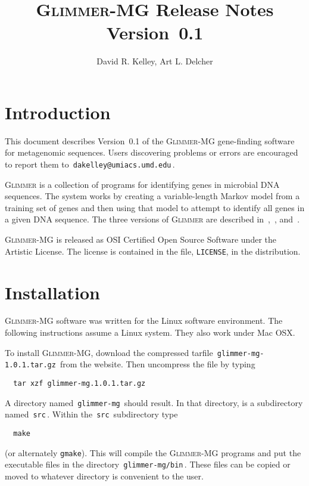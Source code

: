 \documentclass[fleqn,titlepage,11pt]{article}
\def\Glimmer{\textsc{Glimmer}}
\def\Gmg{\textsc{Glimmer-MG}}
\def\Pg#1{\texttt{#1}}
\begin{document}
\RaggedRight
\sloppy

\title{\Gmg{} Release Notes \\ Version~0.1}
\author{David R. Kelley, Art L. Delcher}

\maketitle

\section{Introduction}

This document describes Version~0.1 of the \Gmg{} gene-finding
software for metagenomic sequences.  Users discovering problems or
errors are encouraged to report them to
\,\verb`dakelley@umiacs.umd.edu`\,.

\Glimmer{} is a collection of programs for identifying genes in
microbial DNA sequences.  The system works by creating a
variable-length Markov model from a training set of genes and then
using that model to attempt to identify all genes in a given DNA
sequence.  The three versions of \Glimmer{} are described
in~\cite{glimmer1},~\cite{glimmer2}, and~\cite{glimmer3}.

\Gmg{} is released as OSI Certified Open Source Software under the
Artistic License.  The license is contained in the file, \Pg{LICENSE},
in the distribution.

\section{Installation}

\Gmg{} software was written for the Linux software environment.  The
following instructions assume a Linux system.  They also work under
Mac OSX.

To install \Gmg{}, download the compressed tarfile
\,\verb`glimmer-mg-1.0.1.tar.gz`\,
from the website.  Then uncompress the file by typing
\BSV
\begin{verbatim}
  tar xzf glimmer-mg.1.0.1.tar.gz
\end{verbatim}
\ESV
A directory named \,\verb`glimmer-mg`\, should result.
In that directory, is a subdirectory named \,\verb`src`\,.
Within the \,\verb`src`\, subdirectory type
\BSV
\begin{verbatim}
  make
\end{verbatim}
\ESV
(or alternately \Pg{gmake}).
This will compile the \Gmg{} programs
and put the executable files in the directory
\,\verb`glimmer-mg/bin`\,.  These files can be copied or moved to
whatever directory is convenient to the user.
\end{document}
